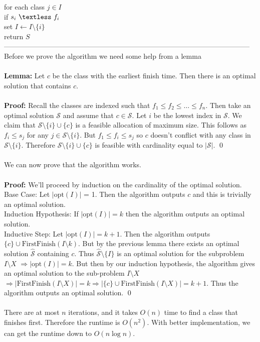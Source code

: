 \documentclass{article}
\newcommand{\lt}{\textless}
\newcommand{\imply}{\Rightarrow}
\newcommand{\lem}{\textbf{Lemma: }}
\newcommand{\proo}{\textbf{Proof: }}
\newcommand{\mcal}[1]{\mathcal{#1}}
\newcommand{\opt}{\text{opt}}
\begin{document}
	\hspace*{14mm} for each class $j \in I$\\
	\hspace*{21mm} if $s_i\ \lt\ f_i$\\
	\hspace*{28mm} set $I \leftarrow I \setminus \{i\}$\\
	\hspace*{7mm} return $S$\\
---------------------------------------------------------------------------------------------------------\\
Before we prove the algorithm we need some help from a lemma\\\\
\lem Let $c$ be the class with the earliest finish time. Then there is an optimal solution that contains $c$.\\\\
\proo Recall the classes are indexed such that $f_1 \leq f_2 \leq \dots \leq f_n$. Then take an optimal solution $\mcal{S}$ and assume that $c \in \mcal{S}$. Let $i$ be the lowest index in $\mcal{S}$. We claim that $\mcal{S} \setminus \{i\} \cup \{c\}$ is a feasible allocation of maximum size. This follows as $f_i \leq s_j$ for any $j \in \mcal{S} \setminus \{i\}$. But $f_1 \leq f_i \leq s_j$ so $c$ doesn't conflict with any class in $\mcal{S} \setminus \{i\}$. Therefore $\mcal{S} \setminus \{i\} \cup \{c\}$ is feasible with cardinality equal to $|\mcal{S}|$.
\qed\\\\
We can now prove that the algorithm works.\\\\
\proo We'll proceed by induction on the cardinality of the optimal solution.\\
Base Case: Let $|\opt(I)|$ = 1. Then the algorithm outputs $c$ and this is trivially an optimal solution.\\
Induction Hypothesis: If $|\opt(I)| = k$ then the algorithm outputs an optimal solution.\\ 
Inductive Step: Let $|\opt(I)| = k+1$. Then the algorithm outputs $\{c\} \cup \text{FirstFinish}(I\setminus k)$. But by the previous lemma there exists an optimal solution $\hat{\mcal{S}}$ containing $c$. Thus $\hat{\mcal{S}}\setminus \{I\}$ is an optimal solution for the subproblem $I \setminus X$ $\imply |\opt(I)| = k$. But then by our induction hypothesis, the algorithm gives an optimal solution to the sub-problem $I \setminus X$ $\imply |\text{FirstFinish}(I \setminus X)| = k \imply |\{c\}\cup\text{FirstFinish}(I \setminus X)| = k+1$. Thus the algorithm outputs an optimal solution.
\qed\\\\
There are at most $n$ iterations, and it takes $O(n)$ time to find a class that finishes first. Therefore the runtime is $O(n^2)$. With better implementation, we can get the runtime down to $O(n \log n)$.
\end{document}
